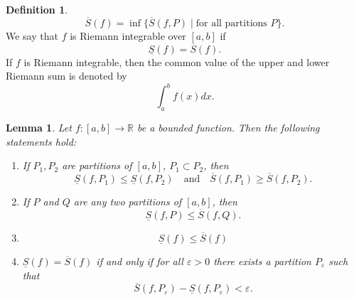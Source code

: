 \documentclass[12pt]{article}
\newtheorem{lemma}[theorem]{Lemma}
\theoremstyle{definition}
\newtheorem{definition}{Definition}[section]
\theoremstyle{definition}
\begin{document}
\begin{definition}
\begin{equation*}
                \overline{S}(f)=\inf \{\overline{S}(f, P)\mid\text{for all
                partitions $P$}\}. 
            \end{equation*}
        We say that $f$ is Riemann integrable over $[a, b]$ if 
            \begin{equation*}
                \underline{S}(f)=\overline{S}(f).
            \end{equation*}
        If $f$ is Riemann integrable, then the common value of the upper
        and lower Riemann sum is denoted by
            \begin{equation*}
                \int_{a}^b f(x)dx.
            \end{equation*}
    \end{definition}
    \begin{lemma}
        Let $f:[a, b]\to\mathbb{R}$ be a bounded function. Then the following
        statements hold:
            \begin{enumerate}[label=(\arabic*)]
                \item If $P_1, P_2$ are partitions of $[a, b]$, $P_1\subset P_2$, 
                    then 
                        \begin{equation*}
                            \underline{S}(f, P_1)\leq\underline{S}(f,
                            P_2)\quad\text{and}\quad\overline{S}(f,
                            P_1)\geq\overline{S}(f, P_2).
                        \end{equation*}
                \item If $P$ and $Q$ are any two partitions of $[a, b]$, then 
                        \begin{equation*}
                            \underline{S}(f, P)\leq\overline{S}(f, Q).
                        \end{equation*}
                \item 
                        \begin{equation*}
                            \underline{S}(f)\leq \overline{S}(f)
                        \end{equation*}
                \item $\underline{S}(f)=\overline{S}(f)$ if and only if for all
                    $\varepsilon>0$ there exists a partition $P_{\varepsilon}$
                    such that
                        \begin{equation*}
                            \overline{S}(f, P_{\varepsilon})-\underline{S}(f,
                            P_{\varepsilon})<\varepsilon.
                        \end{equation*}
            \end{enumerate}
    \end{lemma}
\end{document}
